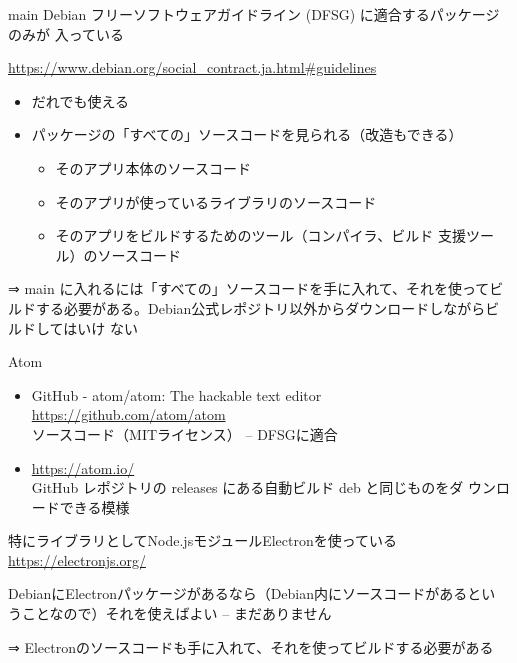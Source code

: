 \begin{frame}{main}
Debian フリーソフトウェアガイドライン (DFSG) に適合するパッケージのみが
 入っている

\url{https://www.debian.org/social_contract.ja.html\#guidelines}

\pause
\begin{itemize}[<+->]
 \item だれでも使える
 \item パッケージの「すべての」ソースコードを見られる{\footnotesize{（改造もできる）}}
       \begin{itemize}[<+->]
	\item そのアプリ本体のソースコード
	\item そのアプリが使っているライブラリのソースコード
	\item そのアプリをビルドするためのツール（コンパイラ、ビルド
	      支援ツール）のソースコード
       \end{itemize}
\end{itemize}

\pause
⇒ main に入れるには「すべての」ソースコードを手に入れて、それを使ってビ
 ルドする必要がある。Debian公式レポジトリ以外からダウンロードしながらビルドしてはいけ
 ない
\end{frame}

\begin{frame}{Atom}
\begin{itemize}
 \item GitHub - atom/atom: The hackable text editor \url{https://github.com/atom/atom} \\
 ソースコード（MITライセンス） -- DFSGに適合
 \item \url{https://atom.io/} \\
       GitHub レポジトリの releases にある自動ビルド deb と同じものをダ
       ウンロードできる模様
\end{itemize}

 \pause
 特にライブラリとしてNode.jsモジュールElectronを使っている
 \url{https://electronjs.org/}

 \pause
 DebianにElectronパッケージがあるなら（Debian内にソースコードがあるとい
 うことなので）それを使えばよい -- まだありません

\pause
 ⇒ Electronのソースコードも手に入れて、それを使ってビルドする必要がある
\end{frame}

